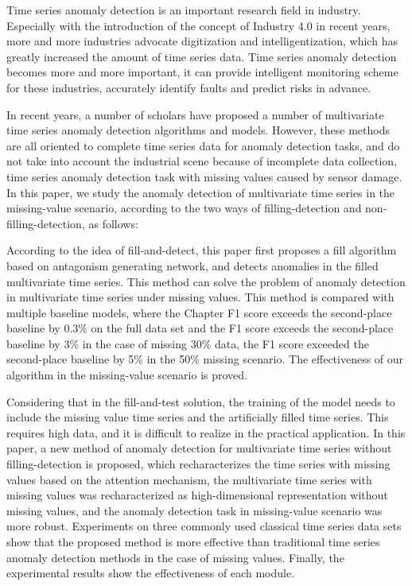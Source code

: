\begin{eabstract}
  Time series anomaly detection is an important research field in industry. Especially with the introduction of the concept of Industry 4.0 in recent years, more and more industries advocate digitization and intelligentization, which has greatly increased the amount of time series data. Time series anomaly detection becomes more and more important, it can provide intelligent monitoring scheme for these industries, accurately identify faults and predict risks in advance.

  In recent years, a number of scholars have proposed a number of multivariate time series anomaly detection algorithms and models. However, these methods are all oriented to complete time series data for anomaly detection tasks, and do not take into account the industrial scene because of incomplete data collection, time series anomaly detection task with missing values caused by sensor damage. In this paper, we study the anomaly detection of multivariate time series in the missing-value scenario, according to the two ways of filling-detection and non-filling-detection, as follows:
  
  According to the idea of fill-and-detect, this paper first proposes a fill algorithm based on antagonism generating network, and detects anomalies in the filled multivariate time series. This method can solve the problem of anomaly detection in multivariate time series under missing values. This method is compared with multiple baseline models, where the Chapter F1 score exceeds the second-place baseline by 0.3\% on the full data set and the F1 score exceeds the second-place baseline by 3\% in the case of missing 30\% data, the F1 score exceeded the second-place baseline by 5\% in the 50\% missing scenario. The effectiveness of our algorithm in the missing-value scenario is proved.
  
  Considering that in the fill-and-test solution, the training of the model needs to include the missing value time series and the artificially filled time series. This requires high data, and it is difficult to realize in the practical application. In this paper, a new method of anomaly detection for multivariate time series without filling-detection is proposed, which recharacterizes the time series with missing values based on the attention mechanism, the multivariate time series with missing values was recharacterized as high-dimensional representation without missing values, and the anomaly detection task in missing-value scenario was more robust. Experiments on three commonly used classical time series data sets show that the proposed method is more effective than traditional time series anomaly detection methods in the case of missing values. Finally, the experimental results show the effectiveness of each module.
\end{eabstract}
